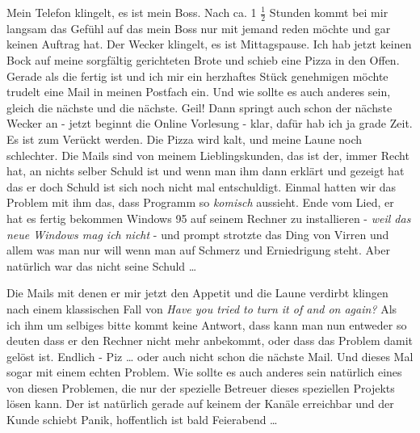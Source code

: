 \documentclass[11pt]{article}
\begin{document}
\noindent Mein Telefon klingelt, es ist mein Boss. Nach ca. 1
\(\frac{1}{2}\) Stunden kommt bei mir langsam das Gefühl auf das mein Boss
nur mit jemand reden möchte und gar keinen Auftrag hat. Der Wecker
klingelt, es ist Mittagspause. Ich hab jetzt keinen Bock auf meine
sorgfältig gerichteten Brote und schieb eine Pizza in den
Offen. Gerade als die fertig ist und ich mir ein herzhaftes Stück
genehmigen möchte trudelt eine Mail in meinen Postfach ein. Und wie
sollte es auch anderes sein, gleich die nächste und die nächste. Geil!
Dann springt auch schon der nächste Wecker an - jetzt beginnt die
Online Vorlesung - klar, dafür hab ich ja grade Zeit. Es ist zum
Verückt werden. Die Pizza wird kalt, und meine Laune noch
schlechter. Die Mails sind von meinem Lieblingskunden, das ist der,
immer Recht hat, an nichts selber Schuld ist und wenn man ihm dann
erklärt und gezeigt hat das er doch Schuld ist sich noch nicht mal
entschuldigt. Einmal hatten wir das Problem mit ihm das, dass Programm
so \emph{komisch} aussieht. Ende vom Lied, er hat es fertig bekommen
Windows 95 auf seinem Rechner zu installieren - \emph{weil das neue Windows
mag ich nicht} - und prompt strotzte das Ding von Virren und allem was
man nur will wenn man auf Schmerz und Erniedrigung steht. Aber
natürlich war das nicht seine Schuld \dots{}\newline

\noindent Die Mails mit denen er mir jetzt den Appetit und die Laune
verdirbt klingen nach einem klassischen Fall von \emph{Have you tried to
turn it of and on again?} Als ich ihm um selbiges bitte kommt keine
Antwort, dass kann man nun entweder so deuten dass er den Rechner
nicht mehr anbekommt, oder dass das Problem damit gelöst
ist. Endlich - Piz \dots{} oder auch nicht schon die nächste Mail. Und
dieses Mal sogar mit einem echten Problem. Wie sollte es auch anderes
sein natürlich eines von diesen Problemen, die nur der spezielle
Betreuer dieses speziellen Projekts lösen kann. Der ist natürlich
gerade auf keinem der Kanäle erreichbar und der Kunde schiebt Panik,
hoffentlich ist bald Feierabend \dots{}\newline
\end{document}
